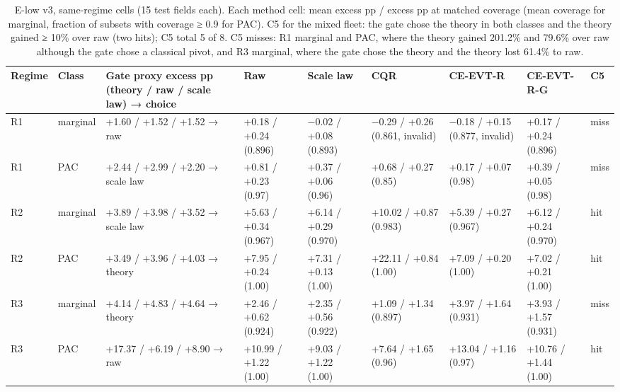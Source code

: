 \documentclass[preprint,12pt,authoryear]{elsarticle}
\begin{document}
\begin{table}[!htbp]
\centering
\scriptsize
\renewcommand{\thetable}{S17}\caption{E-low v3, same-regime cells (15 test fields each). Each method cell: mean excess pp / excess pp at matched coverage (mean coverage for marginal, fraction of subsets with coverage ≥ 0.9 for PAC). C5 for the mixed fleet: the gate chose the theory in both classes and the theory gained ≥ 10\% over raw (two hits); C5 total 5 of 8. C5 misses: R1 marginal and PAC, where the theory gained 201.2\% and 79.6\% over raw although the gate chose a classical pivot, and R3 marginal, where the gate chose the theory and the theory lost 61.4\% to raw.}
\begin{adjustbox}{max width=\textwidth}
\begin{tabular}{@{}ll>{\raggedright\arraybackslash}p{16.5em}ll>{\raggedright\arraybackslash}p{15.0em}>{\raggedright\arraybackslash}p{15.0em}ll@{}}
\toprule
\textbf{Regime} & \textbf{Class} & \textbf{Gate proxy excess pp (theory / raw / scale law) → choice} & \textbf{Raw} & \textbf{Scale law} & \textbf{CQR} & \textbf{CE-EVT-R} & \textbf{CE-EVT-R-G} & \textbf{C5} \\
\midrule
R1 & marginal & +1.60 / +1.52 / +1.52 → raw & +0.18 / +0.24 (0.896) & −0.02 / +0.08 (0.893) & −0.29 / +0.26 (0.861, invalid) & −0.18 / +0.15 (0.877, invalid) & +0.17 / +0.24 (0.896) & miss \\
R1 & PAC & +2.44 / +2.99 / +2.20 → scale law & +0.81 / +0.23 (0.97) & +0.37 / +0.06 (0.96) & +0.68 / +0.27 (0.85) & +0.17 / +0.07 (0.98) & +0.39 / +0.05 (0.98) & miss \\
R2 & marginal & +3.89 / +3.98 / +3.52 → scale law & +5.63 / +0.34 (0.967) & +6.14 / +0.29 (0.970) & +10.02 / +0.87 (0.983) & +5.39 / +0.27 (0.967) & +6.12 / +0.24 (0.970) & hit \\
R2 & PAC & +3.49 / +3.96 / +4.03 → theory & +7.95 / +0.24 (1.00) & +7.31 / +0.13 (1.00) & +22.11 / +0.84 (1.00) & +7.09 / +0.20 (1.00) & +7.02 / +0.21 (1.00) & hit \\
R3 & marginal & +4.14 / +4.83 / +4.64 → theory & +2.46 / +0.62 (0.924) & +2.35 / +0.56 (0.922) & +1.09 / +1.34 (0.897) & +3.97 / +1.64 (0.931) & +3.93 / +1.57 (0.931) & miss \\
R3 & PAC & +17.37 / +6.19 / +8.90 → raw & +10.99 / +1.22 (1.00) & +9.03 / +1.22 (1.00) & +7.64 / +1.65 (0.96) & +13.04 / +1.16 (0.97) & +10.76 / +1.44 (1.00) & hit \\
\bottomrule
\end{tabular}
\end{adjustbox}
\end{table}
\end{document}
